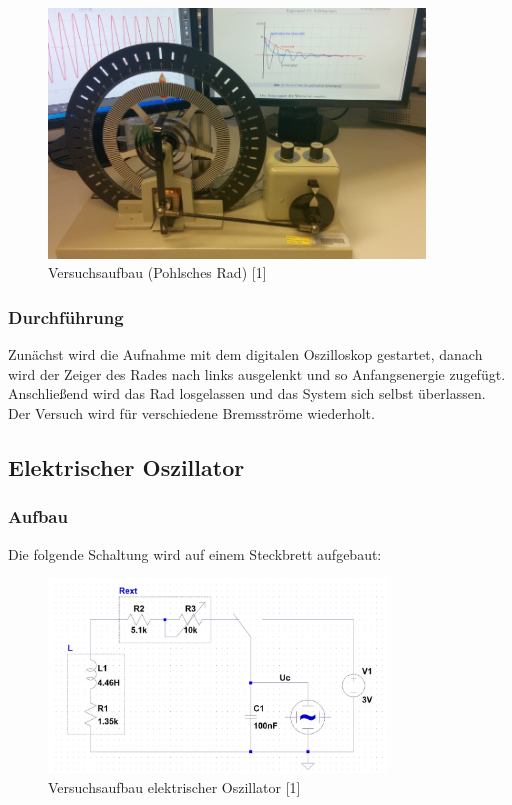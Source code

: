 \documentclass[a4paper]{scrartcl}
\numberwithin{equation}{subsection}
\begin{document}
\begin{figure}[H]
\includegraphics[width=10cm]{Grafik_Pholsches-Rad}
\centering
\caption{Versuchsaufbau (Pohlsches Rad) [1]}
\centering
\end{figure}

\subsubsection{Durchführung}
Zunächst wird die Aufnahme mit dem digitalen Oszilloskop gestartet, danach wird der
Zeiger des Rades nach links ausgelenkt und so Anfangsenergie zugefügt. Anschließend wird das Rad losgelassen und das System sich selbst überlassen. Der Versuch wird für verschiedene Bremsströme wiederholt.

\subsection{Elektrischer Oszillator}
\subsubsection{Aufbau}
Die folgende Schaltung wird auf einem Steckbrett aufgebaut:

\begin{figure}[H]
\includegraphics[width=9cm]{Grafik_el-Oszillator}
\centering
\caption{Versuchsaufbau elektrischer Oszillator [1]}
\centering
\end{figure}
\end{document}
